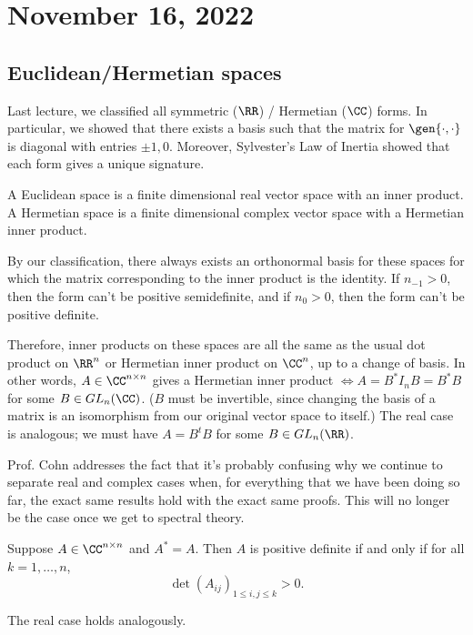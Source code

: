\section{November 16, 2022}

\subsection{Euclidean/Hermetian spaces}

Last lecture, we classified all symmetric ($\RR$) / Hermetian ($\CC$) forms. In particular, we showed that there exists a basis such that the matrix for $\gen{\cdot, \cdot}$ is diagonal with entries $\pm 1, 0$. Moreover, Sylvester's Law of Inertia showed that each form gives a unique signature. 

\begin{definition}

A \ac{Euclidean space} is a finite dimensional real vector space with an inner product. A \ac{Hermetian space} is a finite dimensional complex vector space with a Hermetian inner product. 
\end{definition}

By our classification, there always exists an orthonormal basis for these spaces for which the matrix corresponding to the inner product is the identity. If $n_{-1} > 0$, then the form can't be positive semidefinite, and if $n_0 > 0$, then the form can't be positive definite. 

Therefore, inner products on these spaces are all the same as the usual dot product on $\RR^n$ or Hermetian inner product on $\CC^n$, up to a change of basis. In other words, $A\in \CC^{n\times n}$ gives a Hermetian inner product $\iff A = B^* I_n B = B^*B$ for some $B\in GL_n(\CC)$. ($B$ must be invertible, since changing the basis of a matrix is an isomorphism from our original vector space to itself.) The real case is analogous; we must have $A = B^tB$ for some $B\in GL_n(\RR)$. 

Prof. Cohn addresses the fact that it's probably confusing why we continue to separate real and complex cases when, for everything that we have been doing so far, the exact same results hold with the exact same proofs. This will no longer be the case once we get to spectral theory. 

\begin{theorem}

Suppose $A\in \CC^{n\times n}$ and $A^*=A$. Then $A$ is positive definite if and only if for all $k=1, \hdots, n$,
\[\det (A_{ij})_{1\leq i,j\leq k} > 0.\]

The real case holds analogously. 
\end{theorem}

